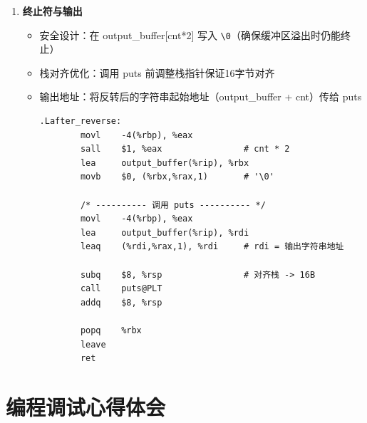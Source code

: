 \documentclass[10pt,a4paper]{article}
\begin{document}
\begin{enumerate}
    \item \textbf{终止符与输出}
    \begin{itemize}
        \item 安全设计：在 output\_buffer[cnt*2] 写入 \verb|\0|（确保缓冲区溢出时仍能终止）
        \item 栈对齐优化：调用 puts 前调整栈指针保证16字节对齐
        \item 输出地址：将反转后的字符串起始地址（output\_buffer + cnt）传给 puts
        \begin{lstlisting}[language={[x86masm]Assembler}]
.Lafter_reverse:
        movl    -4(%rbp), %eax
        sall    $1, %eax                # cnt * 2
        lea     output_buffer(%rip), %rbx
        movb    $0, (%rbx,%rax,1)       # '\0'

        /* ---------- 调用 puts ---------- */
        movl    -4(%rbp), %eax
        lea     output_buffer(%rip), %rdi
        leaq    (%rdi,%rax,1), %rdi     # rdi = 输出字符串地址

        subq    $8, %rsp                # 对齐栈 -> 16B
        call    puts@PLT
        addq    $8, %rsp

        popq    %rbx
        leave
        ret
        \end{lstlisting}
    \end{itemize}
\end{enumerate}

\section{编程调试心得体会}
\end{document}
